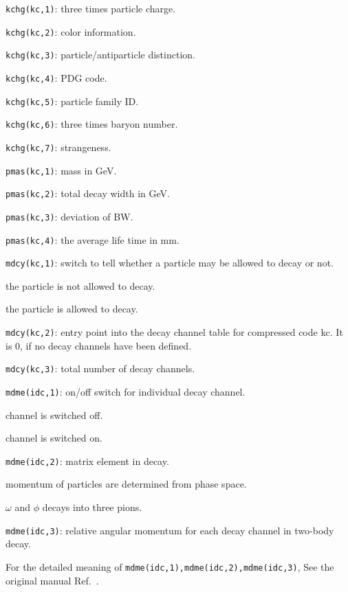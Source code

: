 \documentclass[]{article}
\newenvironment{entry}%
{\begin{list}{}{\setlength{\topsep}{0mm} \setlength{\itemsep}{0mm}
\setlength{\parskip}{0mm} \setlength{\parsep}{0mm}
\setlength{\leftmargin}{20mm} \setlength{\rightmargin}{0mm}
\setlength{\labelwidth}{18mm} \setlength{\labelsep}{2mm}}}%
{\end{list}}
\newenvironment{subentry}%
{\begin{list}{}{\setlength{\topsep}{0mm} \setlength{\itemsep}{0mm}
\setlength{\parskip}{0mm} \setlength{\parsep}{0mm}
\setlength{\leftmargin}{10mm} \setlength{\rightmargin}{0mm}
\setlength{\labelwidth}{18mm} \setlength{\labelsep}{2mm}}}%
{\end{list}}
\newcommand{\ttt}[1]{{\tt#1}}
\newcommand{\itemt}[1]{\item[{\tt #1}\hfill]}
\begin{document}
\begin{entry}
\item[{\tt kchg(kc,1)}:] three times particle charge.
\item[{\tt kchg(kc,2)}:] color information.
\item[{\tt kchg(kc,3)}:] particle/antiparticle distinction.
\item[{\tt kchg(kc,4)}:] PDG code.
\item[{\tt kchg(kc,5)}:] particle family ID.
\item[{\tt kchg(kc,6)}:] three times baryon number.
\item[{\tt kchg(kc,7)}:] strangeness.
\medskip
\item[{\tt pmas(kc,1)}:] mass in GeV.
\item[{\tt pmas(kc,2)}:] total decay width in GeV.
\item[{\tt pmas(kc,3)}:] deviation of BW.
\item[{\tt pmas(kc,4)}:] the average life time in mm.
\medskip
\item[{\tt mdcy(kc,1)}:] switch to tell whether a particle may be allowed
                         to decay or not.
     \begin{subentry}
        \itemt{$=0$:} the particle is not allowed to decay.
        \itemt{$=1$:} the particle is allowed to decay.
     \end{subentry}
\item[{\tt mdcy(kc,2)}:] entry point into the decay channel table
                         for compressed code kc.
                        It is 0, if no decay channels have been defined.
\item[{\tt mdcy(kc,3)}:] total number of decay channels.
\medskip
\item[{\tt mdme(idc,1)}:] on/off switch for individual decay channel.
     \begin{subentry}
       \itemt{$=0$:} channel is switched off.
       \itemt{$=1$:} channel is switched on.
     \end{subentry}

\item[{\tt mdme(idc,2)}:] matrix element in decay.
     \begin{subentry}
       \itemt{$=0$:} momentum of particles are determined from
           phase space.
       \itemt{$=1$:} $\omega$ and $\phi$ decays into three pions.
     \end{subentry}
\item[{\tt mdme(idc,3)}:]  relative angular momentum for each decay channel
                           in two-body decay.
\end{entry}
For the detailed meaning of \ttt{mdme(idc,1),mdme(idc,2),mdme(idc,3)},
  See the original manual Ref.~\cite{pythia}.
\end{document}
